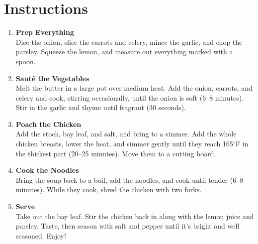 \newpage
{}
\section*{Instructions}

\begin{enumerate}

      \item \textbf{Prep Everything} \\
            Dice the onion, slice the carrots and celery, mince the garlic, and chop the parsley. Squeeze the lemon, and measure out everything marked with a spoon.

      \item \textbf{Sauté the Vegetables} \\
            Melt the butter in a large pot over medium heat. Add the onion, carrots, and celery and cook, stirring occasionally, until the onion is soft (6--8 minutes). Stir in the garlic and thyme until fragrant (30 seconds).

      \item \textbf{Poach the Chicken} \\
            Add the stock, bay leaf, and salt, and bring to a simmer. Add the whole chicken breasts, lower the heat, and simmer gently until they reach 165$^\circ$F in the thickest part (20--25 minutes). Move them to a cutting board.

      \item \textbf{Cook the Noodles} \\
            Bring the soup back to a boil, add the noodles, and cook until tender (6--8 minutes). While they cook, shred the chicken with two forks.

      \item \textbf{Serve} \\
            Take out the bay leaf. Stir the chicken back in along with the lemon juice and parsley. Taste, then season with salt and pepper until it's bright and well seasoned. Enjoy!

\end{enumerate}


